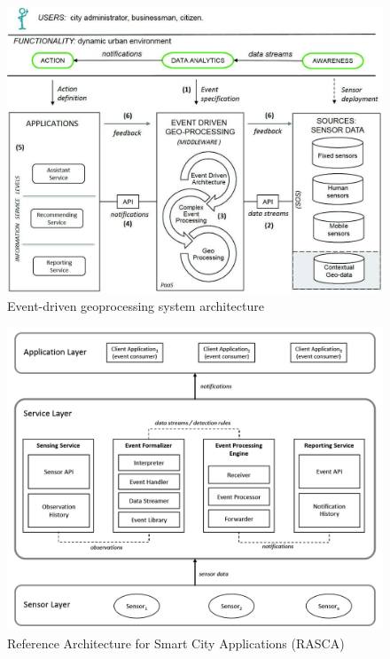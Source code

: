 \documentclass[]{scrartcl}
\begin{document}
\begin{figure}[h]
	\centering
	\includegraphics[width=\textwidth]{Morales_2015}
	\caption{Event-driven geoprocessing system architecture~\cite[p.~3]{Morales.2015}}
	\label{fig:morales-arch}
\end{figure}

\begin{figure}[h]
	\centering
	\includegraphics[width=\textwidth]{Garcia_2019a}
	\caption{Reference Architecture for Smart City Applications (RASCA)~\cite[p.~12]{GarciaAlvarez.2019}}
	\label{fig:rasca}
\end{figure}
\end{document}

